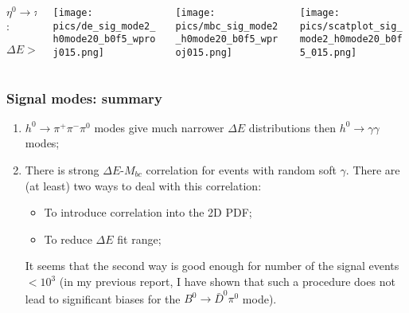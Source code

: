 \documentclass[10 pt,compress,mathserif]{beamer}
\newcommand{\bdpi}{\ensuremath{B^0\to \bar D^0\pi^0}\xspace}
\newcommand{\hgg}{\ensuremath{h^0\to \gamma\gamma}\xspace}
\newcommand{\etappp}{\ensuremath{\eta^0\to \pi^+\pi^-\pi^0}\xspace}
\newcommand{\hppp}{\ensuremath{h^0\to \pi^+\pi^-\pi^0}\xspace}
\begin{document}
\begin{frame}
\begin{small}
  \begin{columns}
  \begin{column}{0.2\textwidth}
   $\etappp$:\\
   \begin{tiny}
   $\Delta E>-0.15\ \text{GeV}$
   \end{tiny}
  \end{column}
  \begin{column}{0.25\textwidth}
   \begin{center}
    {\texttt{[image: pics/de\_sig\_mode2\_h0mode20\_b0f5\_wproj015.png]}}
   \end{center}
  \end{column}
  \begin{column}{0.25\textwidth}
   \begin{center}
    {\texttt{[image: pics/mbc\_sig\_mode2\_h0mode20\_b0f5\_wproj015.png]}}
   \end{center}
  \end{column}
  \begin{column}{0.3\textwidth}
   \begin{center}
    {\texttt{[image: pics/scatplot\_sig\_mode2\_h0mode20\_b0f5\_015.png]}}
   \end{center}
   \end{column}
  \end{columns}
 \end{small}
\end{frame}

\begin{frame}
 \frametitle{Signal modes: summary}
 \begin{enumerate}
  \item \hppp modes give much narrower $\Delta E$ distributions then \hgg modes;
  \item There is strong $\Delta E$-$M_{bc}$ correlation for events with random soft $\gamma$. There are (at least) two ways to deal with this correlation:
  \begin{itemize}
   \item To introduce correlation into the 2D PDF;
   \item To reduce $\Delta E$ fit range;
  \end{itemize}
  It seems that the second way is good enough for number of the signal events $<10^3$ (in my previous report, I have shown that such a procedure does not lead to significant biases for the \bdpi mode).
 \end{enumerate}

\end{frame}
\end{document}
